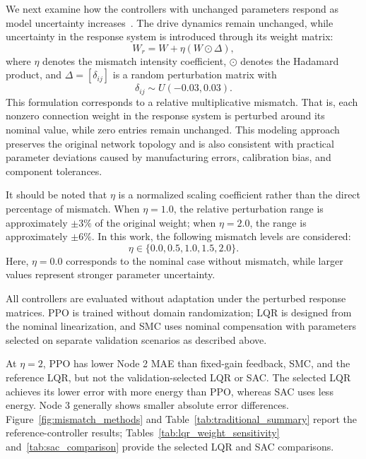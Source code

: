 \documentclass[a4paper,fleqn]{cas-dc}
\theoremstyle{plain}
\theoremstyle{definition}
\begin{document}
We next examine how the controllers with unchanged parameters respond as model uncertainty increases~\cite{zhang2011weak}. The drive dynamics remain unchanged, while uncertainty in the response system is introduced through its weight matrix:
\begin{equation}
	W_r = W + \eta (W\odot \Delta),
	\label{eq:mismatch_matrix}
\end{equation}
where $\eta$ denotes the mismatch intensity coefficient, $\odot$ denotes the Hadamard product, and $\Delta=[\delta_{ij}]$ is a random perturbation matrix with
\begin{equation}
	\delta_{ij}\sim U(-0.03,0.03).
	\label{eq:mismatch_delta}
\end{equation}
This formulation corresponds to a relative multiplicative mismatch. That is, each nonzero connection weight in the response system is perturbed around its nominal value, while zero entries remain unchanged. This modeling approach preserves the original network topology and is also consistent with practical parameter deviations caused by manufacturing errors, calibration bias, and component tolerances.

It should be noted that $\eta$ is a normalized scaling coefficient rather than the direct percentage of mismatch. When $\eta=1.0$, the relative perturbation range is approximately $\pm 3\%$ of the original weight; when $\eta=2.0$, the range is approximately $\pm 6\%$. In this work, the following mismatch levels are considered:
\begin{equation}
	\eta\in\{0.0,0.5,1.0,1.5,2.0\}.
	\label{eq:mismatch_levels}
\end{equation}
Here, $\eta=0.0$ corresponds to the nominal case without mismatch, while larger values represent stronger parameter uncertainty.

All controllers are evaluated without adaptation under the perturbed response matrices. PPO is trained without domain randomization; LQR is designed from the nominal linearization, and SMC uses nominal compensation with parameters selected on separate validation scenarios as described above.

At $\eta=2$, PPO has lower Node 2 MAE than fixed-gain feedback, SMC, and the reference LQR, but not the validation-selected LQR or SAC. The selected LQR achieves its lower error with more energy than PPO, whereas SAC uses less energy. Node 3 generally shows smaller absolute error differences. Figure~\ref{fig:mismatch_methods} and Table~\ref{tab:traditional_summary} report the reference-controller results; Tables~\ref{tab:lqr_weight_sensitivity} and~\ref{tab:sac_comparison} provide the selected LQR and SAC comparisons.
\end{document}
